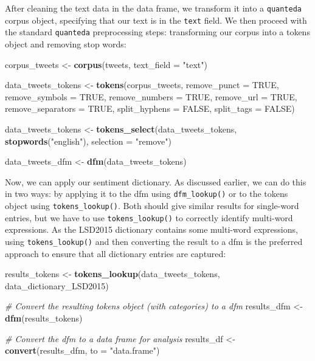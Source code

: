 \documentclass[
]{book}
\newenvironment{Shaded}{\begin{snugshade}}{\end{snugshade}}
\newcommand{\AttributeTok}[1]{\textcolor[rgb]{0.13,0.29,0.53}{#1}}
\newcommand{\CommentTok}[1]{\textcolor[rgb]{0.56,0.35,0.01}{\textit{#1}}}
\newcommand{\ConstantTok}[1]{\textcolor[rgb]{0.56,0.35,0.01}{#1}}
\newcommand{\FunctionTok}[1]{\textcolor[rgb]{0.13,0.29,0.53}{\textbf{#1}}}
\newcommand{\NormalTok}[1]{#1}
\newcommand{\OtherTok}[1]{\textcolor[rgb]{0.56,0.35,0.01}{#1}}
\newcommand{\StringTok}[1]{\textcolor[rgb]{0.31,0.60,0.02}{#1}}
\begin{document}
After cleaning the text data in the data frame, we transform it into a \texttt{quanteda} corpus object, specifying that our text is in the \texttt{text} field. We then proceed with the standard \texttt{quanteda} preprocessing steps: transforming our corpus into a tokens object and removing stop words:

\begin{Shaded}
\begin{Highlighting}[]
\NormalTok{corpus\_tweets }\OtherTok{\textless{}{-}} \FunctionTok{corpus}\NormalTok{(tweets, }\AttributeTok{text\_field =} \StringTok{"text"}\NormalTok{)}

\NormalTok{data\_tweets\_tokens }\OtherTok{\textless{}{-}} \FunctionTok{tokens}\NormalTok{(corpus\_tweets, }\AttributeTok{remove\_punct =} \ConstantTok{TRUE}\NormalTok{, }\AttributeTok{remove\_symbols =} \ConstantTok{TRUE}\NormalTok{,}
    \AttributeTok{remove\_numbers =} \ConstantTok{TRUE}\NormalTok{, }\AttributeTok{remove\_url =} \ConstantTok{TRUE}\NormalTok{, }\AttributeTok{remove\_separators =} \ConstantTok{TRUE}\NormalTok{, }\AttributeTok{split\_hyphens =} \ConstantTok{FALSE}\NormalTok{,}
    \AttributeTok{split\_tags =} \ConstantTok{FALSE}\NormalTok{)}

\NormalTok{data\_tweets\_tokens }\OtherTok{\textless{}{-}} \FunctionTok{tokens\_select}\NormalTok{(data\_tweets\_tokens, }\FunctionTok{stopwords}\NormalTok{(}\StringTok{"english"}\NormalTok{), }\AttributeTok{selection =} \StringTok{"remove"}\NormalTok{)}

\NormalTok{data\_tweets\_dfm }\OtherTok{\textless{}{-}} \FunctionTok{dfm}\NormalTok{(data\_tweets\_tokens)}
\end{Highlighting}
\end{Shaded}

Now, we can apply our sentiment dictionary. As discussed earlier, we can do this in two ways: by applying it to the dfm using \texttt{dfm\_lookup()} or to the tokens object using \texttt{tokens\_lookup()}. Both should give similar results for single-word entries, but we have to use \texttt{tokens\_lookup()} to correctly identify multi-word expressions. As the LSD2015 dictionary contains some multi-word expressions, using \texttt{tokens\_lookup()} and then converting the result to a dfm is the preferred approach to ensure that all dictionary entries are captured:

\begin{Shaded}
\begin{Highlighting}[]
\NormalTok{results\_tokens }\OtherTok{\textless{}{-}} \FunctionTok{tokens\_lookup}\NormalTok{(data\_tweets\_tokens, data\_dictionary\_LSD2015)}

\CommentTok{\# Convert the resulting tokens object (with categories) to a dfm}
\NormalTok{results\_dfm }\OtherTok{\textless{}{-}} \FunctionTok{dfm}\NormalTok{(results\_tokens)}

\CommentTok{\# Convert the dfm to a data frame for analysis}
\NormalTok{results\_df }\OtherTok{\textless{}{-}} \FunctionTok{convert}\NormalTok{(results\_dfm, }\AttributeTok{to =} \StringTok{"data.frame"}\NormalTok{)}
\end{Highlighting}
\end{Shaded}
\end{document}

